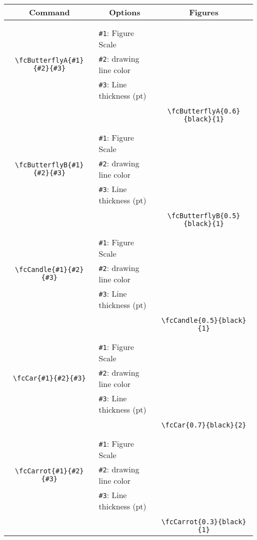 \documentclass{article}
\begin{document}
\begin{table}[H]\centering\begin{tabular}{|c|l|c|}\hline {\bf Command}& \multicolumn{1}{c|}{{\bf Options}} & {\bf Figures}\\  \hline	&&\multirow{5}{*}{\fcButterflyA{0.6}{black}{1}}\\	&&\\	&\verb|#1|: Figure Scale &\\	\verb|\fcButterflyA{#1}{#2}{#3}|&	\verb|#2|: drawing line color &\\	&\verb|#3|: Line thickness (pt) &\\ &&\\&&	\verb|\fcButterflyA{0.6}{black}{1}|\\\hline 	
	&&\multirow{5}{*}{\fcButterflyB{0.5}{black}{1}}\\	&&\\	&\verb|#1|: Figure Scale &\\	\verb|\fcButterflyB{#1}{#2}{#3}|&	\verb|#2|: drawing line color &\\	&\verb|#3|: Line thickness (pt) &\\ &&\\&&	\verb|\fcButterflyB{0.5}{black}{1}|\\\hline 	
	&&\multirow{5}{*}{\fcCandle{0.5}{black}{1}}\\	&&\\	&\verb|#1|: Figure Scale &\\	\verb|\fcCandle{#1}{#2}{#3}|&	\verb|#2|: drawing line color &\\	&\verb|#3|: Line thickness (pt) &\\ &&\\&&	\verb|\fcCandle{0.5}{black}{1}|\\\hline 	
	&&\multirow{5}{*}{\fcCar{0.7}{black}{2}}\\	&&\\	&\verb|#1|: Figure Scale &\\	\verb|\fcCar{#1}{#2}{#3}|&	\verb|#2|: drawing line color &\\	&\verb|#3|: Line thickness (pt) &\\ &&\\&&	\verb|\fcCar{0.7}{black}{2}|\\\hline 	
	&&\multirow{5}{*}{\fcCarrot{0.3}{black}{1}}\\	&&\\	&\verb|#1|: Figure Scale &\\	\verb|\fcCarrot{#1}{#2}{#3}|&	\verb|#2|: drawing line color &\\	&\verb|#3|: Line thickness (pt) &\\ &&\\&&	\verb|\fcCarrot{0.3}{black}{1}|\\\hline 	

\end{tabular}
\end{table}
\end{document}
